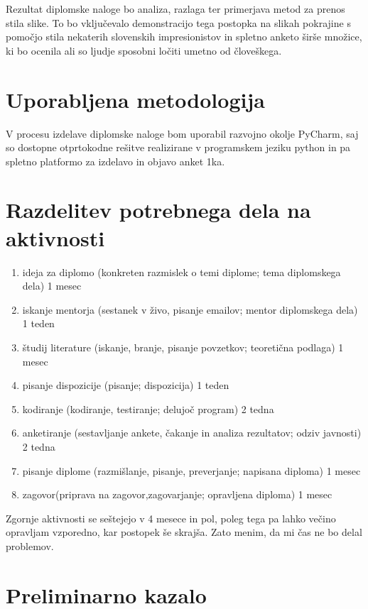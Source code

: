 \documentclass[11pt,a4paper]{article}
\begin{document}
Rezultat diplomske naloge bo analiza, razlaga ter primerjava metod za prenos stila slike. To bo vključevalo demonstracijo tega postopka na slikah pokrajine s pomočjo stila nekaterih slovenskih impresionistov in spletno anketo širše množice, ki bo ocenila ali so ljudje sposobni ločiti umetno od človeškega.


\section{Uporabljena metodologija}

V procesu izdelave diplomske naloge bom uporabil razvojno okolje PyCharm, saj so dostopne otprtokodne rešitve realizirane v programskem jeziku python in pa spletno platformo za izdelavo in objavo anket 1ka.

\section{Razdelitev potrebnega dela na aktivnosti}

\begin{enumerate}
  \item ideja za diplomo (konkreten razmislek o temi diplome; tema diplomskega dela) 1 mesec
  \item iskanje mentorja (sestanek v živo, pisanje emailov; mentor diplomskega dela) 1 teden
  \item \v{s}tudij literature (iskanje, branje, pisanje povzetkov; teoretična podlaga) 1 mesec
  \item pisanje dispozicije (pisanje; dispozicija) 1 teden
  \item kodiranje (kodiranje, testiranje; delujoč program) 2 tedna
  \item anketiranje (sestavljanje ankete, čakanje in analiza rezultatov; odziv javnosti) 2 tedna
  \item pisanje diplome (razmišlanje, pisanje, preverjanje; napisana diploma) 1 mesec
  \item zagovor(priprava na zagovor,zagovarjanje; opravljena diploma) 1 mesec
\end{enumerate}


Zgornje aktivnosti se seštejejo v 4 mesece in pol, poleg tega pa lahko večino opravljam vzporedno, kar postopek še skrajša. Zato menim, da mi čas ne bo delal problemov.


\section{Preliminarno kazalo}
\end{document}
